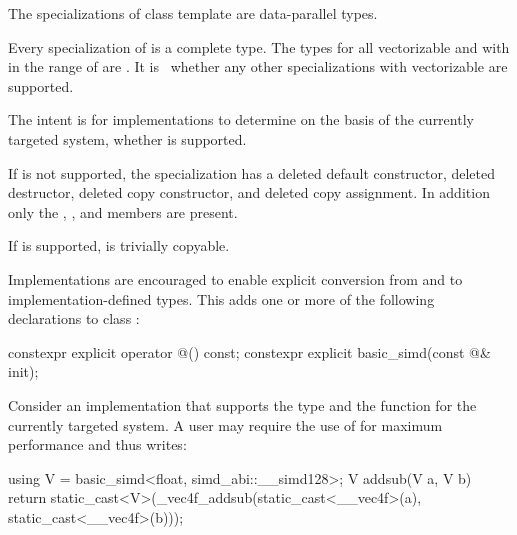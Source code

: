 \pnum
The specializations of class template  are data-parallel types.

\pnum
Every specialization of  is a complete type.
The types  for all vectorizable
 and with  in the range of \tcode{[1, 64]} are .
It is \impdef\ whether any other  specializations
with vectorizable  are supported.

\begin{note}
  The intent is for implementations to determine on the basis of the currently
  targeted system, whether  is supported.
\end{note}

If  is not supported, the specialization has a
deleted default constructor, deleted destructor, deleted copy constructor, and
deleted copy assignment.
In addition only the , , and
 members are present.

If  is supported,  is
trivially copyable.

\pnum
Implementations are encouraged to enable explicit conversion from and to
implementation-defined types. This adds one or more of the following
declarations to class :

\begin{codeblock}
constexpr explicit operator @\impdef@() const;
constexpr explicit basic_simd(const @\impdef@& init);
\end{codeblock}

\begin{example}
  Consider an implementation that supports the type  and the function  for the currently targeted system.
  A user may require the use of  for maximum performance and thus writes:
  \begin{codeblock}
    using V = basic_simd<float, simd_abi::__simd128>;
    V addsub(V a, V b) {
      return static_cast<V>(_vec4f_addsub(static_cast<__vec4f>(a), static_cast<__vec4f>(b)));
    }
  \end{codeblock}
\end{example}

